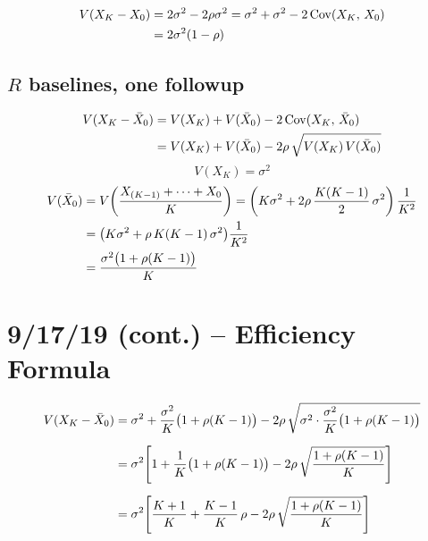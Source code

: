 \documentclass[11pt]{article}
\newcommand{\Cov}{\operatorname{Cov}}
\begin{document}
\begin{align}
  V(X_K - X_0)
  &= 2\sigma^2 - 2\rho\sigma^2
   = \sigma^2 + \sigma^2
     - 2\Cov(X_K,\, X_0) \notag \\
  &= 2\sigma^2(1 - \rho)
\end{align}

\subsection*{$R$ baselines, one followup}

\begin{align}
  V(X_K - \bar{X}_0)
  &= V(X_K) + V(\bar{X}_0)
     - 2\Cov(X_K,\, \bar{X}_0) \label{eq:Rbaseline} \\
  &= V(X_K) + V(\bar{X}_0)
     - 2\rho\,\sqrt{V(X_K)\,V(\bar{X}_0)} \notag
\end{align}
\begin{equation}
  V(X_K) = \sigma^2
\end{equation}
\begin{align}
  V(\bar{X}_0)
  &= V\!\left(\frac{X_{(K-1)} + \cdots + X_0}{K}\right)
   = \left(K\sigma^2
     + 2\rho\,\frac{K(K-1)}{2}\,\sigma^2\right)
     \frac{1}{K^2} \notag \\
  &= \bigl(K\sigma^2 + \rho\,K(K-1)\,\sigma^2\bigr)
     \frac{1}{K^2} \notag \\
  &= \frac{\sigma^2\bigl(1 + \rho(K-1)\bigr)}{K}
\end{align}


\newpage
\section{9/17/19 (cont.) -- Efficiency Formula}

\begin{align}
  V(X_K - \bar{X}_0)
  &= \sigma^2
    + \frac{\sigma^2}{K}\bigl(1 + \rho(K-1)\bigr)
    - 2\rho\,\sqrt{\sigma^2 \cdot
      \frac{\sigma^2}{K}\bigl(1 + \rho(K-1)\bigr)}
    \notag \\[6pt]
  &= \sigma^2\!\left[
      1 + \frac{1}{K}\bigl(1 + \rho(K-1)\bigr)
      - 2\rho\,\sqrt{\frac{1+\rho(K-1)}{K}}
    \right] \notag \\[6pt]
  &= \sigma^2\!\left[
      \frac{K+1}{K}
      + \frac{K-1}{K}\,\rho
      - 2\rho\,\sqrt{\frac{1+\rho(K-1)}{K}}
    \right]
\end{align}
\end{document}
